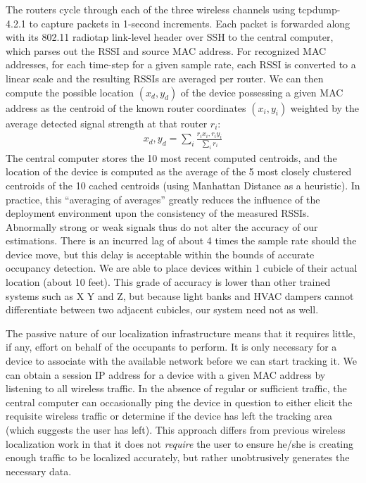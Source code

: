 The routers cycle through each of the three wireless channels using tcpdump-4.2.1 to capture packets in 1-second increments. Each packet is forwarded along with its 802.11 radiotap link-level header over SSH to the central computer, which parses out the RSSI and source MAC address. For recognized MAC addresses, for each time-step for a given sample rate, each RSSI is converted to a linear scale and the resulting RSSIs are averaged per router. We can then compute the possible location $(x_d,y_d)$ of the device possessing a given MAC address as the centroid of the known router coordinates $(x_i, y_i)$ weighted by the average detected signal strength at that router $r_i$:
\begin{equation}
\begin{split}
x_d, y_d = \displaystyle\sum_{i} \frac{r_ix_i, r_iy_i}{\displaystyle\sum_i r_i}
\end{split}
\end{equation}
The central computer stores the 10 most recent computed centroids, and the location of the device is computed as the average of the 5 most closely clustered centroids of the 10 cached centroids (using Manhattan Distance as a heuristic). In practice, this ``averaging of averages'' greatly reduces the influence of the deployment environment upon the consistency of the measured RSSIs. Abnormally strong or weak signals thus do not alter the accuracy of our estimations. There is an incurred lag of about 4 times the sample rate should the device move, but this delay is acceptable within the bounds of accurate occupancy detection. We are able to place devices within 1 cubicle of their actual location (about 10 feet). This grade of accuracy is lower than other trained systems such as X Y and Z, but because light banks and HVAC dampers cannot differentiate between two adjacent cubicles, our system need not as well.

The passive nature of our localization infrastructure means that it requires little, if any, effort on behalf of the occupants to perform. It is only necessary for a device to associate with the available network before we can start tracking it. We can obtain a session IP address for a device with a given MAC address by listening to all wireless traffic. In the absence of regular or sufficient traffic, the central computer can occasionally ping the device in question to either elicit the requisite wireless traffic or determine if the device has left the tracking area (which suggests the user has left). This approach differs from previous wireless localization work in that it does not \emph{require} the user to ensure he/she is creating enough traffic to be localized accurately, but rather unobtrusively generates the necessary data. 

